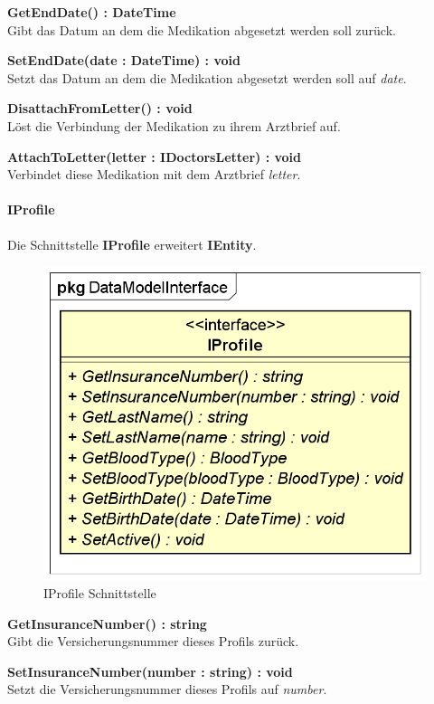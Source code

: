 \documentclass[a4paper]{scrreprt}
\begin{document}
\textbf{GetEndDate() : DateTime}\\
Gibt das Datum an dem die Medikation abgesetzt werden soll zurück.

\textbf{SetEndDate(date : DateTime) : void}\\
Setzt das Datum an dem die Medikation abgesetzt werden soll auf \textit{date}.

\textbf{DisattachFromLetter() : void}\\
Löst die Verbindung der Medikation zu ihrem Arztbrief auf.

\textbf{AttachToLetter(letter : IDoctorsLetter) : void}\\
Verbindet diese Medikation mit dem Arztbrief \textit{letter}.


\paragraph{IProfile}
Die Schnittstelle \textbf{IProfile} erweitert \textbf{IEntity}.

\begin{figure}[H]
\centering
\includegraphics[width=0.75\textheight]{graphics/Klassendiagramme/Model/IProfile.png}
\caption{IProfile Schnittstelle}
\end{figure}
\textbf{GetInsuranceNumber() : string}\\
Gibt die Versicherungsnummer dieses Profils zurück.

\textbf{SetInsuranceNumber(number : string) : void}\\
Setzt die Versicherungsnummer dieses Profils auf \textit{number}.
\end{document}
